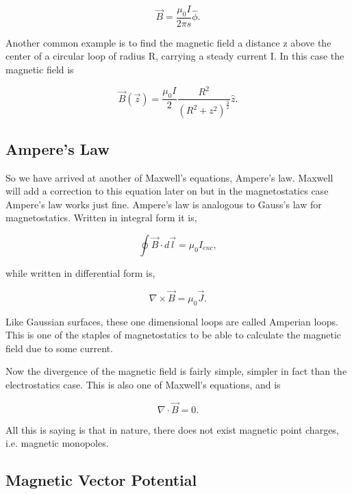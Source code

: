 \documentclass[preprint, review,12pt]{elsarticle}
\def\x{\times}
\def\.{\cdot}
\begin{document}
\begin{equation}
    \vec{B} = \frac{\mu_0I}{2\pi s}\hat{\phi}.
\end{equation}

Another common example is to find the magnetic field a distance z above the center of a circular loop of radius R, carrying a steady current I. In this case the magnetic field is

\begin{equation}
    \vec{B}(\vec{z}) = \frac{\mu_0I}{2} \frac{R^2}{(R^2+z^2)^\frac{3}{2}}\hat{z}.
\end{equation}

\subsection{Ampere's Law}

So we have arrived at another of Maxwell's equations, Ampere's law. Maxwell will add a correction to this equation later on but in the magnetostatics case Ampere's law works just fine. Ampere's law is analogous to Gauss's law for magnetostatics. Written in integral form it is,

\begin{equation}
    \oint \vec{B} \. d\vec{l} = \mu_0 I_{enc},
\end{equation}

while written in differential form is,

\begin{equation}
    \nabla \x \vec{B} = \mu_0 \vec{J}.
\end{equation}

Like Gaussian surfaces, these one dimensional loops are called Amperian loops. This is one of the staples of magnetostatics to be able to calculate the magnetic field due to some current. 

Now the divergence of the magnetic field is fairly simple, simpler in fact than the electrostatics case. This is also one of Maxwell's equations, and is

\begin{equation}
    \nabla \. \vec{B} = 0.
\end{equation}

All this is saying is that in nature, there does not exist magnetic point charges, i.e. magnetic monopoles. 

\subsection{Magnetic Vector Potential}
\end{document}
